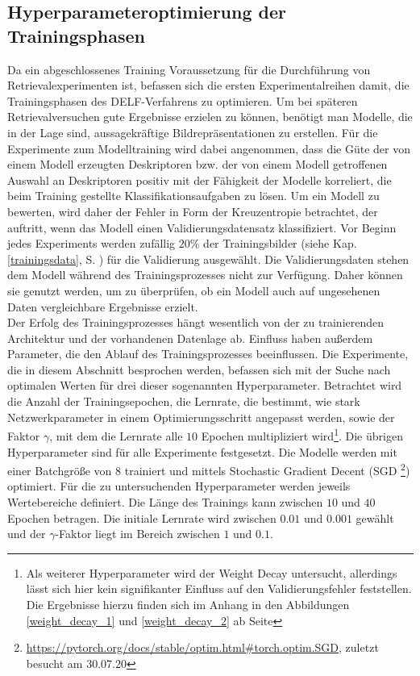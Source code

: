 \subsection{Hyperparameteroptimierung der Trainingsphasen}\label{hyperparam}
Da ein abgeschlossenes Training Voraussetzung für die Durchführung von Retrievalexperimenten ist, befassen sich die ersten Experimentalreihen damit, die Trainingsphasen des DELF-Verfahrens zu optimieren. Um bei späteren Retrievalversuchen gute Ergebnisse erzielen zu können, benötigt man Modelle, die in der Lage sind, aussagekräftige Bildrepräsentationen zu erstellen. Für die Experimente zum Modelltraining wird dabei angenommen, dass die Güte der von einem Modell erzeugten Deskriptoren bzw. der von einem Modell getroffenen Auswahl an Deskriptoren positiv mit der Fähigkeit der Modelle korreliert, die beim Training gestellte Klassifikationsaufgaben zu lösen. Um ein Modell zu bewerten, wird daher der Fehler in Form der Kreuzentropie betrachtet, der auftritt, wenn das Modell einen Validierungsdatensatz klassifiziert. Vor Beginn jedes Experiments werden zufällig $20\%$ der Trainingsbilder (siehe Kap. \ref{trainingsdata}, S. \pageref{trainingsdata}) für die Validierung ausgewählt. Die Validierungsdaten stehen dem Modell während des Trainingsprozesses nicht zur Verfügung. Daher können sie genutzt werden, um zu überprüfen, ob ein Modell auch auf ungesehenen Daten vergleichbare Ergebnisse erzielt.
\\
Der Erfolg des Trainingsprozesses hängt wesentlich von der zu trainierenden Architektur und der vorhandenen Datenlage ab. Einfluss haben außerdem Parameter, die den Ablauf des Trainingsprozesses beeinflussen. Die Experimente, die in diesem Abschnitt besprochen werden, befassen sich mit der Suche nach optimalen Werten für drei dieser sogenannten Hyperparameter. Betrachtet wird die Anzahl der Trainingsepochen, die Lernrate, die bestimmt, wie stark Netzwerkparameter in einem Optimierungsschritt angepasst werden, sowie der Faktor $\gamma$, mit dem die Lernrate alle $10$ Epochen multipliziert wird\footnote{Als weiterer Hyperparameter wird der Weight Decay untersucht, allerdings lässt sich hier kein signifikanter Einfluss auf den Validierungsfehler feststellen. Die Ergebnisse hierzu finden sich im Anhang in den Abbildungen \ref{weight_decay_1} und \ref{weight_decay_2} ab Seite \pageref{weight_decay_1}}. Die übrigen Hyperparameter sind für alle Experimente festgesetzt. Die Modelle werden mit einer Batchgröße von $8$ trainiert und mittels Stochastic Gradient Decent (SGD \footnote{\url{https://pytorch.org/docs/stable/optim.html\#torch.optim.SGD}, zuletzt besucht am 30.07.20}) optimiert. Für die zu untersuchenden Hyperparameter werden jeweils Wertebereiche definiert. Die Länge des Trainings kann zwischen $10$ und $40$ Epochen betragen. Die initiale Lernrate wird zwischen $0.01$ und $0.001$ gewählt und der $\gamma$-Faktor liegt im Bereich zwischen $1$ und $0.1$.
